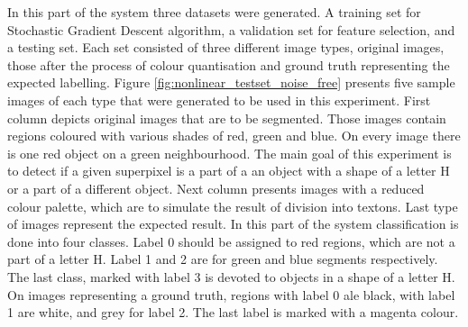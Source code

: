 In this part of the system three datasets were generated. A training set for Stochastic Gradient Descent algorithm, a validation set for feature selection, and a testing set. Each set consisted of three different image types, original images, those after the process of colour quantisation and ground truth representing the expected labelling. Figure
\ref{fig:nonlinear_testset_noise_free} presents five sample images of each type that were generated to be used in this experiment.
First column depicts original images that are to be segmented. Those images contain regions coloured with various shades of red, green and blue. On every image there is one red object on a green neighbourhood. The main goal of this experiment is to detect if a given superpixel is a part of a an object with a shape of a letter H or a part of a different object. Next column presents images with a reduced colour palette, which are to simulate the result of division into textons. Last type of images represent the expected result. In this part of the system classification is done into four classes. Label 0 should be assigned to red regions, which are not a part of a letter H. Label 1 and 2 are for green and blue segments respectively. The last class, marked with label 3 is devoted to objects in a shape of a letter H. On images representing a ground truth, regions with label 0 ale black, with label 1 are white, and grey for label 2. The last label is marked with a magenta colour. 

